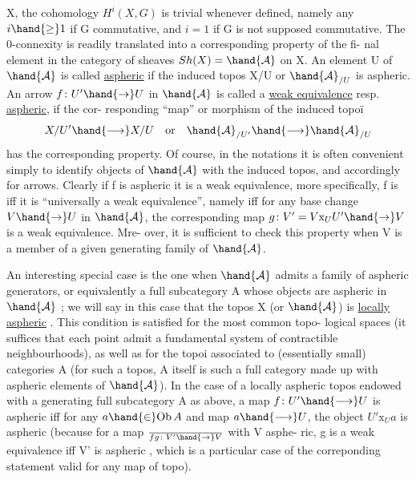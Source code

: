 X, the cohomology  $H^i(X,G)$  is trivial whenever defined, namely  any
$i\hand{\geq}1$ if G commutative, and $i=1$ if G is not supposed commutative. The
0-connexity is readily translated into a corresponding property of the fi-%
nal element in the category of sheaves $Sh(X)=\hand{\mathcal{A}}$ on X. An element  U of $\hand{\mathcal{A}}$
is called \uline{aspheric} if the induced topos X/U or $\hand{\mathcal{A}}_{/U}$ is aspheric. An arrow
$f\colon U'\hand{\to} U$ in $\hand{\mathcal{A}}$ is called a \uline{weak equivalence} resp. \uline{aspheric}, if the cor-%
responding ``map'' or morphism of the induced topoï
\[ X/U'\hand{\longrightarrow} X/U \quad\text{or}\quad \hand{\mathcal{A}}_{/U'}\hand{\longrightarrow}\hand{\mathcal{A}}_{/U} \]
has the corresponding property. Of course, in the notations it is often
convenient simply to identify objects  of $\hand{\mathcal{A}}$ with the induced topos, and
accordingly for arrows.  Clearly if f is aspheric it is a
weak equivalence, more specifically, f is  iff it is
``universally a weak equivalence'', namely iff for any base change $V\hand{\to}U$ in
$\hand{\mathcal{A}}$, the corresponding map $g\colon V'=V\mathrm{x}_U U'\hand{\to}V$ is a weak equivalence. Mre-%
over, it is sufficient to check this property when V is a member of a
given generating family of $\hand{\mathcal{A}}$.

An interesting special case is the one when $\hand{\mathcal{A}}$ admits a family of
aspheric generators, or equivalently a  full subcategory A whose objects
are aspheric in $\hand{\mathcal{A}}$ ; we will say in this case that the topos X (or $\hand{\mathcal{A}}$) is
\hand{*}\uline{locally aspheric} . This condition is satisfied for the most common topo-%
logical spaces (it suffices that each point admit a fundamental system of
contractible neighbourhoods), as well as for the topoi  associated to
(essentially small) categories A (for such a topos, A itself is such a
 full category made up with aspheric elements of $\hand{\mathcal{A}}$). In the case of a
locally aspheric topos endowed with a generating full subcategory A as
above, a map $f\colon U'\hand{\longrightarrow} U$ is aspheric iff for any $a \hand{\in} \mathrm{Ob}\,A$ and map $a\hand{\longrightarrow} U$,
the object $U'\mathrm{x}_U a$ is aspheric (because for a map $\over{f}{g}\colon V'\hand{\to} V$ with V asphe-%
ric, g is a weak equivalence iff V' is aspheric , which is a particular
case of the correponding statement valid for any map of topo).

